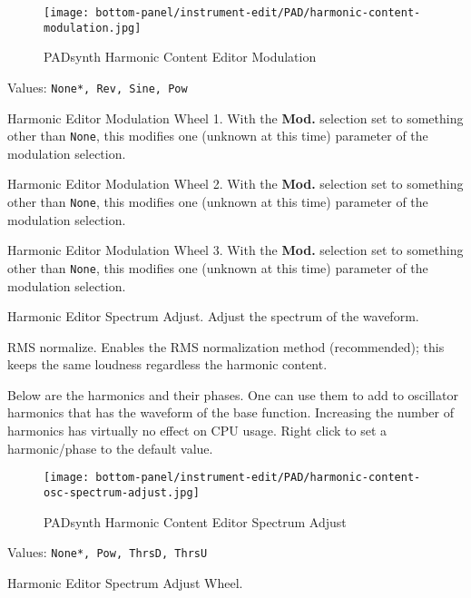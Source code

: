 \begin{figure}[H]
   \centering
   \texttt{[image: bottom-panel/instrument-edit/PAD/harmonic-content-modulation.jpg]}
   \caption{PADsynth Harmonic Content Editor Modulation}
   \label{fig:padsynth_harmonic_content_editor_modulation}
\end{figure}

   Values: \texttt{None*, Rev, Sine, Pow}

   Harmonic Editor Modulation Wheel 1.
   With the \textbf{Mod.} selection set to something other than
   \texttt{None}, this modifies one (unknown at this time) parameter of the
   modulation selection.

   Harmonic Editor Modulation Wheel 2.
   With the \textbf{Mod.} selection set to something other than
   \texttt{None}, this modifies one (unknown at this time) parameter of the
   modulation selection.

   Harmonic Editor Modulation Wheel 3.
   With the \textbf{Mod.} selection set to something other than
   \texttt{None}, this modifies one (unknown at this time) parameter of the
   modulation selection.

   Harmonic Editor Spectrum Adjust.
   Adjust the spectrum of the waveform.

   RMS normalize. Enables the RMS normalization method (recommended); this
   keeps the same loudness regardless the harmonic content.

   Below are the harmonics and their phases. One can use them to add to
   oscillator harmonics that has the waveform of the base function.
   Increasing the number of harmonics has virtually no effect on CPU usage.
   Right click to set a harmonic/phase to the default value.

\begin{figure}[H]
   \centering
   \texttt{[image: bottom-panel/instrument-edit/PAD/harmonic-content-osc-spectrum-adjust.jpg]}
   \caption{PADsynth Harmonic Content Editor Spectrum Adjust}
   \label{fig:padsynth_harmonic_content_editor_spectrum_adjust}
\end{figure}

   Values: \texttt{None*, Pow, ThrsD, ThrsU}

   Harmonic Editor Spectrum Adjust Wheel.

